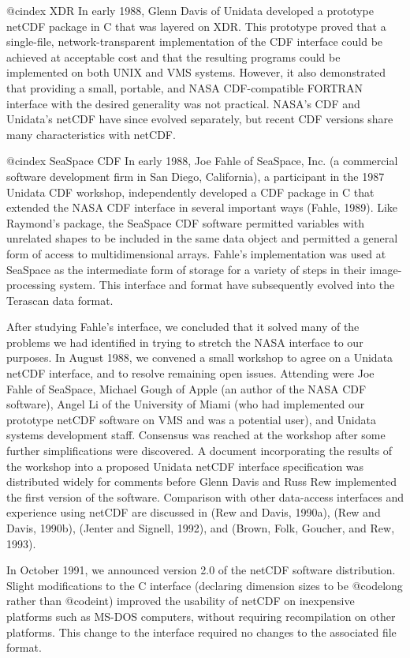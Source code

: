 @cindex XDR
In early 1988, Glenn Davis of Unidata developed a prototype netCDF
package in C that was layered on XDR.  This
prototype proved that a single-file, network-transparent implementation
of the CDF interface could be achieved at acceptable cost and that the
resulting programs could be implemented on both UNIX and VMS systems.
However, it also demonstrated that providing a small, portable, and NASA
CDF-compatible FORTRAN interface with the desired generality was not
practical.  NASA's CDF and Unidata's netCDF have since evolved
separately, but recent CDF versions share many characteristics with
netCDF.

@cindex SeaSpace CDF
In early 1988, Joe Fahle of SeaSpace, Inc. (a commercial software
development firm in San Diego, California), a participant in the 1987
Unidata CDF workshop, independently developed a CDF package in C that
extended the NASA CDF interface in several important ways (Fahle, 1989).
Like Raymond's package, the SeaSpace CDF software permitted variables
with unrelated shapes to be included in the same data object and
permitted a general form of access to multidimensional
arrays.  Fahle's implementation was used at SeaSpace as the intermediate
form of storage for a variety of steps in their image-processing
system.  This interface and format have subsequently evolved into the
Terascan data format.

After studying Fahle's interface, we concluded that it solved many of
the problems we had identified in trying to stretch the NASA interface
to our purposes.  In August 1988, we convened a small workshop to agree
on a Unidata netCDF interface, and to resolve remaining open issues.
Attending were Joe Fahle of SeaSpace, Michael Gough of Apple (an author
of the NASA CDF software), Angel Li of the University of Miami (who had
implemented our prototype netCDF software on VMS and was a potential
user), and Unidata systems development staff.  Consensus was reached at
the workshop after some further simplifications were discovered.  A
document incorporating the results of the workshop into a proposed
Unidata netCDF interface specification was distributed widely for
comments before Glenn Davis and Russ Rew implemented the first version
of the software.  Comparison with other data-access interfaces and
experience using netCDF are discussed in (Rew and Davis, 1990a), (Rew
and Davis, 1990b), (Jenter and Signell, 1992), and (Brown, Folk,
Goucher, and Rew, 1993).

In October 1991, we announced version 2.0 of the netCDF software
distribution.  Slight modifications to the C interface (declaring
dimension sizes to be @code{long} rather than @code{int}) improved the
usability of netCDF on inexpensive platforms such as MS-DOS computers,
without requiring recompilation on other platforms.  This change to the
interface required no changes to the associated file format.

